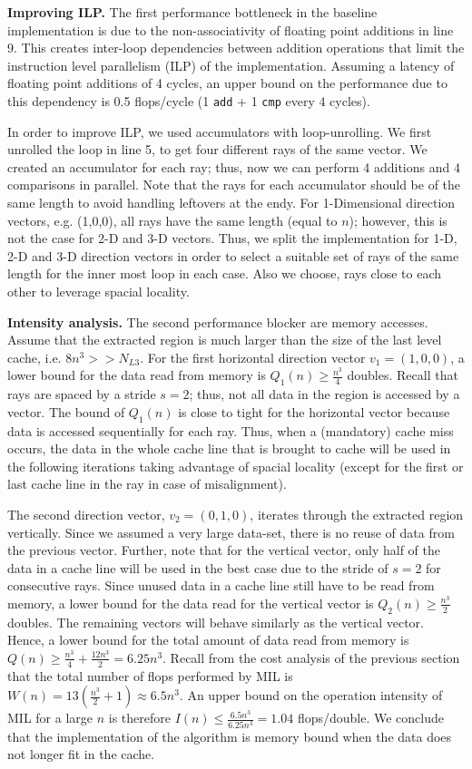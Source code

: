 \documentclass[letterpaper]{article}
\newcommand{\mypar}[1]{{\bf #1.}}
\begin{document}
\mypar{Improving ILP}
The first performance bottleneck in the baseline implementation is due to the non-associativity of floating point additions in line 9. This creates inter-loop dependencies between addition operations that limit the instruction level parallelism (ILP) of the implementation. Assuming a latency of floating point additions of 4 cycles, an upper bound on the performance due to this dependency is 0.5 flops/cycle (1 \texttt{add} + 1 \texttt{cmp} every 4 cycles).

In order to improve ILP, we used accumulators with loop-unrolling. We first unrolled the loop in line 5, to get four different rays of the same vector. We created an accumulator for each ray; thus, now we can perform 4 additions and 4 comparisons in parallel. Note that the rays for each accumulator should be of the same length to avoid handling leftovers at the endy. For 1-Dimensional direction vectors, e.g. (1,0,0), all rays have the same length (equal to $n$); however, this is not the case for 2-D and 3-D vectors. Thus, we split the implementation for 1-D, 2-D and 3-D direction vectors in order to select a suitable set of rays of the same length for the inner most loop in each case. Also we choose, rays close to each other to leverage spacial locality.

\mypar{Intensity analysis}
The second performance blocker are memory accesses. Assume that the extracted region is much larger than the size of the last level cache, i.e. $8n^3 >> N_{L3}$. For the first horizontal direction vector $v_1 = (1,0,0)$, a lower bound for the data read from memory is $Q_1(n) \geq \frac{n^3}{4}$ doubles. Recall that rays are spaced by a stride $s=2$; thus, not all data in the region is accessed by a vector. The bound of $Q_1(n)$ is close to tight for the horizontal vector because data is accessed sequentially for each ray. Thus, when a (mandatory) cache miss occurs, the data in the whole cache line that is brought to cache will be used in the following iterations taking advantage of spacial locality (except for the first or last cache line in the ray in case of misalignment). 

The second direction vector, $v_2 = (0,1,0)$, iterates through the extracted region vertically. Since we assumed a very large data-set, there is no reuse of data from the previous vector. Further, note that for the vertical vector, only half of the data in a cache line will be used in the best case due to the stride of $s=2$ for consecutive rays. Since unused data in a cache line still have to be read from memory, a lower bound for the data read for the vertical vector is $Q_2(n) \geq \frac{n^3}{2}$ doubles. The remaining vectors will behave similarly as the vertical vector. Hence, a lower bound for the total amount of data read from memory is $Q(n) \geq \frac{n^3}{4} + \frac{12n^3}{2} = 6.25n^3$. Recall from the cost analysis of the previous section that the total number of flops performed by MIL is $W(n)=13(\frac{n^{3}}{2}+1) \approx 6.5n^3$. An upper bound on the operation intensity of MIL for a large $n$ is therefore $I(n) \leq \frac{6.5n^3}{6.25n^3} = 1.04$ flops/double. We conclude that the implementation of the algorithm is memory bound when the data does not longer fit in the cache. 
\end{document}
